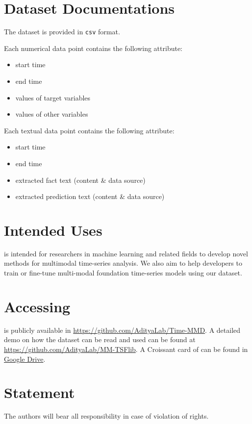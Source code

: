 \section{Dataset Documentations}

The dataset is provided in \texttt{csv} format.

Each numerical data point contains the following attribute: 
\begin{itemize}
    \item start time
    \item end time
    \item values of target variables
    \item values of other variables
\end{itemize}
Each textual data point contains the following attribute: 
\begin{itemize}
    \item start time
    \item end time
    \item extracted fact text (content \& data source)
    \item extracted prediction text (content \& data source)
\end{itemize}

\section{Intended Uses}

\model is intended for researchers in machine learning and related fields to develop novel methods for multimodal time-series analysis. We also aim to help developers to train or fine-tune multi-modal foundation time-series models using our dataset.

\section{Accessing}

\model is publicly available in \url{https://github.com/AdityaLab/Time-MMD}. 
 A detailed demo on how the dataset can be read and used can be found at \url{https://github.com/AdityaLab/MM-TSFlib}. A Croissant card of \model can be found in \href{https://drive.google.com/file/d/1XGnCv6UVTGujWr6CwGFpg9_-qxPeniOb/view?usp=sharing}{Google Drive}.
\section{Statement}

The authors will bear all responsibility in case of violation of rights.

